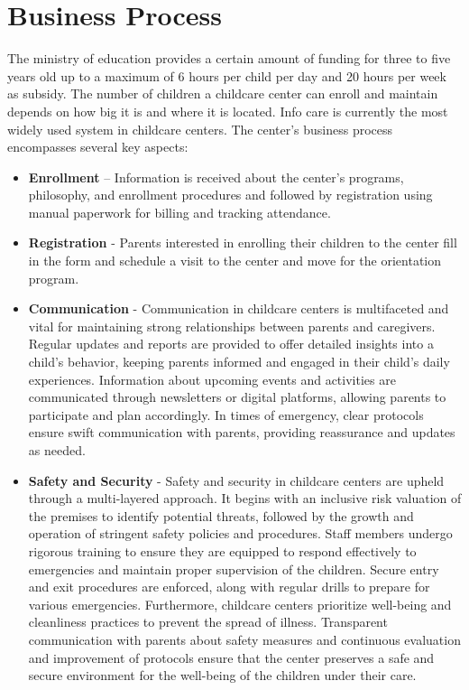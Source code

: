 \section{Business Process}
The ministry of education provides a certain amount of funding for three to five years old up to a maximum of 6 hours per child per day and 20 hours per week as subsidy. The number of children a childcare center can enroll and maintain depends on how big it is and where it is located. Info care is currently the most widely used system in childcare centers. The center’s business process encompasses several key aspects: 

\begin{itemize}
    \item \textbf{Enrollment} – Information is received about the center’s programs, philosophy, and enrollment procedures and followed by registration using manual paperwork for billing and tracking attendance.
    \item \textbf{Registration} - Parents interested in enrolling their children to the center fill in the form and schedule a visit to the center and move for the orientation program. 
    \item \textbf{Communication} - Communication in childcare centers is multifaceted and vital for maintaining strong relationships between parents and caregivers. Regular updates and reports are provided to offer detailed insights into a child's behavior, keeping parents informed and engaged in their child's daily experiences. Information about upcoming events and activities are communicated through newsletters or digital platforms, allowing parents to participate and plan accordingly. In times of emergency, clear protocols ensure swift communication with parents, providing reassurance and updates as needed. \cite{mitchell2006teachers}
    \item \textbf{Safety and Security} - Safety and security in childcare centers are upheld through a multi-layered approach. It begins with an inclusive risk valuation of the premises to identify potential threats, followed by the growth and operation of stringent safety policies and procedures. Staff members undergo rigorous training to ensure they are equipped to respond effectively to emergencies and maintain proper supervision of the children. Secure entry and exit procedures are enforced, along with regular drills to prepare for various emergencies. Furthermore, childcare centers prioritize well-being and cleanliness practices to prevent the spread of illness. Transparent communication with parents about safety measures and continuous evaluation and improvement of protocols ensure that the center preserves a safe and secure environment for the well-being of the children under their care.  

\end{itemize}
